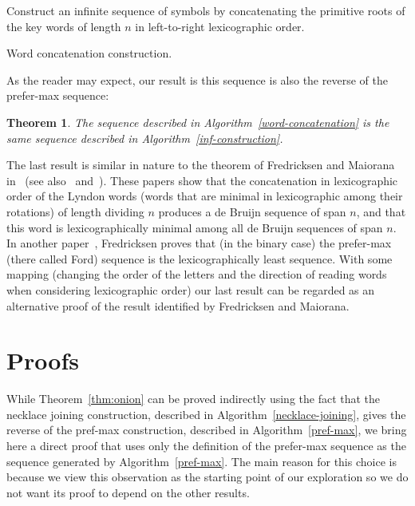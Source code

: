 \documentclass{article} %
\newtheorem{theorem}{Theorem} \newtheorem{proposition}[theorem]{Proposition}
\theoremstyle{definition} \newtheorem{definition}[theorem]{Definition}
\begin{document}
	
	\begin{algorithm}[!h] Construct an infinite sequence of symbols by
		concatenating the primitive roots of the key words of length $n$ in
		left-to-right lexicographic order. \caption{Word concatenation construction.}
		\label{word-concatenation} \end{algorithm}
	
	As the reader may expect, our result is this sequence is also the reverse of
	the prefer-max sequence:
	
	\begin{theorem} The sequence described in Algorithm~\ref{word-concatenation} is
		the same sequence described in Algorithm~\ref{inf-construction}. \end{theorem}
	
	The last result is similar in nature to the theorem of Fredricksen and Maiorana
	in~\cite{Fredricksen1978} (see also~\cite{Moreno2004} and~\cite{Moreno2015}).
	These papers show that the concatenation in lexicographic order of the Lyndon
	words (words that are minimal in lexicographic among their rotations) of length
	dividing $n$ produces a de Bruijn sequence of span $n$, and that this word is
	lexicographically minimal among all de Bruijn sequences of span $n$. In another
	paper~\cite{Fredricksen1970}, Fredricksen proves that (in the binary case) the
	prefer-max (there called Ford) sequence is the lexicographically least
	sequence. With some mapping (changing the order of the letters and the
	direction of reading words when considering lexicographic order) our last
	result can be regarded as an alternative proof of the result identified by
	Fredricksen and Maiorana.
	
	
	\section{Proofs}
	
	While Theorem~\ref{thm:onion} can be proved indirectly using the fact that the
	necklace joining construction, described in Algorithm~\ref{necklace-joining},
	gives the reverse of the pref-max construction, described in
	Algorithm~\ref{pref-max}, we bring here a direct proof that uses only the
	definition of the prefer-max sequence as the sequence generated by
	Algorithm~\ref{pref-max}. The main reason for this choice is because we view
	this observation as the starting point of our exploration so we do not want its
	proof to depend on the other results.
	
\end{document}
